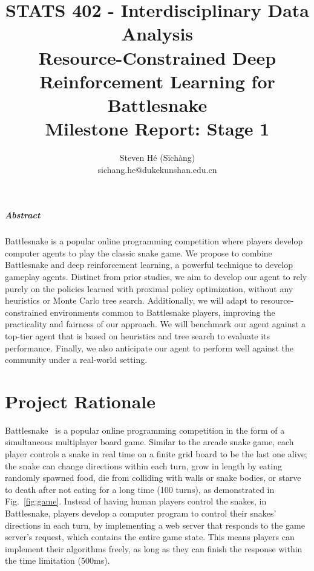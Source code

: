\documentclass[a4paper]{article}
\title{STATS 402 - Interdisciplinary Data Analysis\\
    Resource-Constrained Deep Reinforcement Learning for Battlesnake\\
    Milestone Report: Stage 1
}
\author{Steven Hé (Sīchàng)\\
    sichang.he@dukekunshan.edu.cn
}
\newcommand{\todo}[1]{\textcolor{red}{[ #1 ]}}
\renewcommand{\todo}[1]{} %
\begin{document}
\maketitle

\subparagraph{Abstract}

\todo{Insert a very brief paragraph describing your project (200 words)}

Battlesnake is a popular online programming competition where players develop
computer agents to play the classic snake game.
We propose to combine Battlesnake and deep reinforcement learning,
a powerful technique to develop gameplay agents. Distinct from prior studies,
we aim to develop our agent to rely purely on the policies learned with proximal
policy optimization, without any heuristics or Monte Carlo tree search.
Additionally,
we will adapt to resource-constrained environments common to Battlesnake
players, improving the practicality and fairness of our approach.
We will benchmark our agent against a top-tier agent that is based on heuristics
and tree search to evaluate its performance. Finally,
we also anticipate our agent to perform well against the community under a
real-world setting.

\section{Project Rationale}

\todo{explain the motivation of the project
    selection by analyzing the characteristics of the selected data set,
    as well as the development trend of related fields, application prospects,
    and commonly used methods}

Battlesnake~\cite{battlesnake}
is a popular online programming competition in the form of a simultaneous
multiplayer board game. Similar to the arcade snake game,
each player controls a snake in real time on a finite grid board to be the last
one alive; the snake can change directions within each turn,
grow in length by eating randomly spawned food,
die from colliding with walls or snake bodies,
or starve to death after not eating for a long time (100 turns),
as demonstrated in Fig.~\ref{fig:game}.
Instead of having human players control the snakes, in Battlesnake,
players develop a computer program to control their snakes' directions in each
turn, by implementing a web server that responds to the game server's request,
which contains the entire game state.
This means players can implement their algorithms freely,
as long as they can finish the response within the time limitation (500ms).
\end{document}
